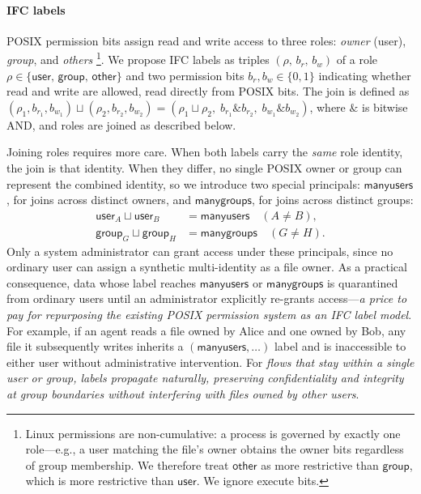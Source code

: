 \documentclass{kaw}
\begin{document}
\paragraph{IFC labels}
POSIX permission bits assign read and write access to three roles:
\emph{owner} (user), \emph{group}, and \emph{others}
\footnote{Linux permissions are non-cumulative: a process is governed by
  exactly one role---e.g., a user matching the file's owner obtains the owner
  bits regardless of group membership.
  We therefore treat $\mathsf{other}$ as more restrictive than $\mathsf{group}$,
  which is more restrictive than $\mathsf{user}$.   
  We ignore execute bits.
  }.
%
We propose IFC labels as triples $(\rho,\, b_r,\, b_w)$ of a role
$\rho \in \{\mathsf{user},\, \mathsf{group},\, \mathsf{other}\}$ and two
permission bits $b_r, b_w \in \{0,1\}$ indicating whether read and write are
allowed, read directly from POSIX bits.
%
The join is defined as
$(\rho_1, b_{r_1}, b_{w_1}) \sqcup (\rho_2, b_{r_2}, b_{w_2}) =
(\rho_1 \sqcup \rho_2,\; b_{r_1} \mathbin{\&} b_{r_2},\; b_{w_1} \mathbin{\&} b_{w_2})$,
where $\mathbin{\&}$ is bitwise AND, and roles are joined as described below.

Joining roles requires more care.
%
When both labels carry the \emph{same} role identity, the join is that identity.
When they differ, no single POSIX owner or group can represent the combined
identity, so we introduce two special principals:
$\mathsf{manyusers}$, for joins across distinct owners, and
$\mathsf{manygroups}$, for joins across distinct groups:
%
\begin{align*}
  \mathsf{user}_A \sqcup \mathsf{user}_B &= \mathsf{manyusers} \quad (A \neq B), \\
  \mathsf{group}_G \sqcup \mathsf{group}_H &= \mathsf{manygroups} \quad (G \neq H).
\end{align*}
%
Only a system administrator can grant access under these principals, since no
ordinary user can assign a synthetic multi-identity as a file owner.
%
As a practical consequence, data whose label reaches $\mathsf{manyusers}$ or
$\mathsf{manygroups}$ is quarantined from ordinary users until an administrator
explicitly re-grants access---\emph{a price to pay for repurposing the
existing POSIX permission system as an IFC label model}.
%
For example, if an agent reads a file owned by Alice and one owned by Bob, any
file it subsequently writes inherits a $(\mathsf{manyusers}, \ldots)$ label and
is inaccessible to either user without administrative intervention.
For \emph{flows that stay within a single user or group, labels propagate naturally,
preserving confidentiality and integrity at group boundaries without interfering
with files owned by other users}.
\end{document}
